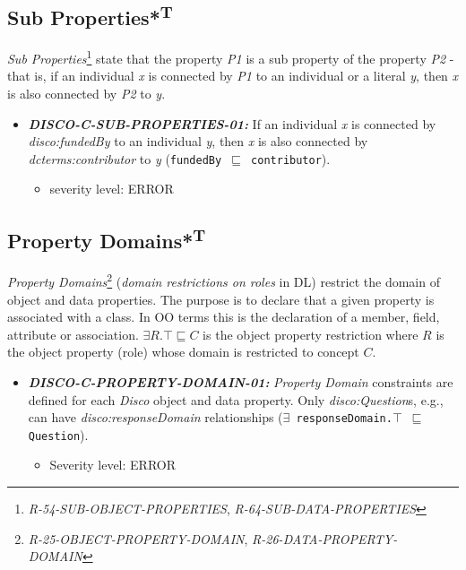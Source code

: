 \documentclass{llncs}
\newcommand{\ms}[1]{\texttt{#1}}
\begin{document}
\subsection{Sub Properties*\textsuperscript{T}}

{\em Sub Properties}\footnote{\emph{R-54-SUB-OBJECT-PROPERTIES}, \emph{R-64-SUB-DATA-PROPERTIES}} state that the property \emph{P1} is a sub property of the property \emph{P2} - that is, if an individual \emph{x} is connected by \emph{P1} to an individual or a literal \emph{y}, then \emph{x} is also connected by \emph{P2} to \emph{y}. 

\begin{itemize}
	\item \textbf{{\em DISCO-C-SUB-PROPERTIES-01:}}
If an individual \emph{x} is connected by {\em disco:fundedBy} to an individual \emph{y}, then \emph{x} is also connected by {\em dcterms:contributor} to \emph{y} (\ms{fundedBy $\sqsubseteq$ contributor}). 
	\begin{itemize}
		\item severity level: ERROR
	\end{itemize}
\end{itemize}

\subsection{Property Domains*\textsuperscript{T}}

{\em Property Domains}\footnote{{\em R-25-OBJECT-PROPERTY-DOMAIN}, {\em R-26-DATA-PROPERTY-DOMAIN}} ({\em domain restrictions on roles} in DL) restrict the domain of object and data properties.
The purpose is to declare that a given property is associated with a class. 
In OO terms this is the declaration of a member, field, attribute or association. 
$\exists R. \top \sqsubseteq C$ is the object property restriction where $R$ is the object property (role) whose domain is restricted to concept $C$.

\begin{itemize}
	\item \textbf{{\em DISCO-C-PROPERTY-DOMAIN-01:}} 
	{\em Property Domain} constraints are defined for each \emph{Disco} object and data property.
  Only {\em disco:Question}s, e.g., can have {\em disco:responseDomain} relationships (\ms{$\exists$ responseDomain.$\top$ $\sqsubseteq$ Question}).
	\begin{itemize}
		\item Severity level: ERROR
	\end{itemize}
\end{itemize}
\end{document}
